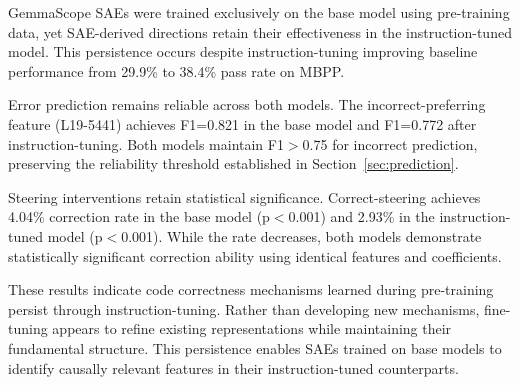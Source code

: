 GemmaScope SAEs were trained exclusively on the base model using pre-training data, yet SAE-derived directions retain their effectiveness in the instruction-tuned model. This persistence occurs despite instruction-tuning improving baseline performance from 29.9\% to 38.4\% pass rate on MBPP.

Error prediction remains reliable across both models. The incorrect-preferring feature (L19-5441) achieves F1=0.821 in the base model and F1=0.772 after instruction-tuning. Both models maintain F1$>$0.75 for incorrect prediction, preserving the reliability threshold established in Section~\ref{sec:prediction}.

Steering interventions retain statistical significance. Correct-steering achieves 4.04\% correction rate in the base model (p$<$0.001) and 2.93\% in the instruction-tuned model (p$<$0.001). While the rate decreases, both models demonstrate statistically significant correction ability using identical features and coefficients.

These results indicate code correctness mechanisms learned during pre-training persist through instruction-tuning. Rather than developing new mechanisms, fine-tuning appears to refine existing representations while maintaining their fundamental structure. This persistence enables SAEs trained on base models to identify causally relevant features in their instruction-tuned counterparts.